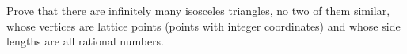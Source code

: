 Prove that there are infinitely many isosceles triangles, no two of them similar, whose vertices are lattice points (points with integer coordinates) and whose side lengths are all rational numbers.
